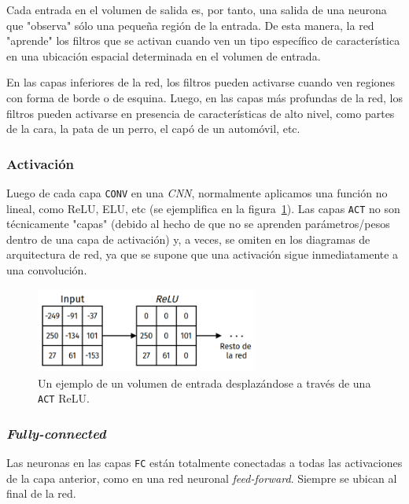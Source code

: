 \documentclass[a4paper,12pt]{article}
\begin{document}
\clearpage

Cada entrada en el volumen de salida es, por tanto, una salida de una neurona que "observa" sólo una pequeña región de la entrada. De esta manera, la red "aprende" los filtros que se activan cuando ven un tipo específico de característica en una ubicación espacial determinada en el volumen de entrada.

En las capas inferiores de la red, los filtros pueden activarse cuando ven regiones con forma de borde o de esquina. Luego, en las capas más profundas de la red, los filtros pueden activarse en presencia de características de alto nivel, como partes de la cara, la pata de un perro, el capó de un automóvil, etc.

\subsubsection{Activación}

Luego de cada capa \texttt{CONV} en una \textit{CNN}, normalmente aplicamos una función no lineal, como ReLU, ELU, etc (se ejemplifica en la figura~\ref{fig:relu-act}). Las capas \texttt{ACT} no son técnicamente "capas" (debido al hecho de que no se aprenden parámetros/pesos dentro de una capa de activación) y, a veces, se omiten en los diagramas de arquitectura de red, ya que se supone que una activación sigue inmediatamente a una convolución.

\begin{figure}[H]
	\begin{center}				
		\includegraphics[width=0.65\textwidth]{tesis_47.png}
		\caption{Un ejemplo de un volumen de entrada desplazándose a través de una \texttt{ACT} ReLU.}
		\label{fig:relu-act}
	\end{center}
\end{figure}

\subsubsection{\textit{Fully-connected}}
Las neuronas en las capas \texttt{FC} están totalmente conectadas a todas las activaciones de la capa anterior, como en una red neuronal \textit{feed-forward}. Siempre se ubican al final de la red.
\end{document}
